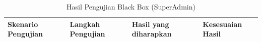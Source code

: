 \begin{longtable}{|p{3.8cm}|p{4.5cm}|p{4.5cm}|p{2cm}|} %
    \caption{Hasil Pengujian Black Box (SuperAdmin) } \label{tabel:hasil_bb_superadmin}                                                                                                                                                                                                                                                                                                                                                                                                                                                 \\
    \hline
    \textbf{Skenario Pengujian}                                    & \textbf{Langkah Pengujian}                                                                                                                                                                                                                                             & \textbf{Hasil yang diharapkan}                                                                                                                                & \textbf{Kesesuaian Hasil} \\
    \hline
    \endfirsthead




\end{longtable}
